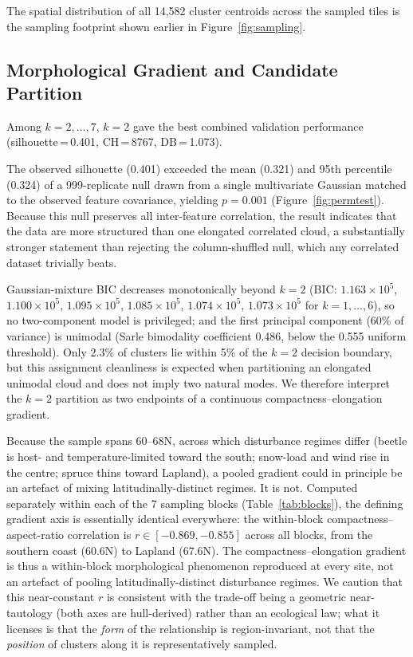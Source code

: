 \documentclass[twocolumn]{article}
\begin{document}
The spatial distribution of all 14,582 cluster centroids across the sampled tiles is the sampling
footprint shown earlier in Figure~\ref{fig:sampling}.

\subsection{Morphological Gradient and Candidate Partition}
\label{sec:res-typology}

Among $k=2,\ldots,7$, $k=2$ gave the best combined validation performance
(silhouette\,=\,0.401, CH\,=\,8767, DB\,=\,1.073).

The observed silhouette (0.401) exceeded the mean (0.321) and 95th percentile (0.324) of a
999-replicate null drawn from a single multivariate Gaussian matched to the observed feature
covariance, yielding $p = 0.001$ (Figure~\ref{fig:permtest}). Because this null preserves all
inter-feature correlation, the result indicates that the data are more structured than one
elongated correlated cloud, a substantially stronger statement than rejecting the
column-shuffled null, which any correlated dataset trivially beats.

Gaussian-mixture BIC decreases monotonically beyond $k=2$ (BIC: $1.163\times10^5$, $1.100\times10^5$,
$1.095\times10^5$, $1.085\times10^5$, $1.074\times10^5$, $1.073\times10^5$ for $k=1,\ldots,6$),
so no two-component model is privileged; and the first principal component (60\% of variance) is
unimodal (Sarle bimodality coefficient 0.486, below the 0.555 uniform threshold). Only 2.3\% of
clusters lie within 5\% of the $k=2$ decision boundary, but this assignment cleanliness is
expected when partitioning an elongated unimodal cloud and does not imply two natural modes.
We therefore interpret the $k=2$ partition as two endpoints of a continuous
compactness--elongation gradient.

Because the sample spans 60--68\textdegree{}N, across which disturbance regimes differ (beetle is
host- and temperature-limited toward the south; snow-load and wind rise in the centre; spruce
thins toward Lapland), a pooled gradient could in principle be an artefact of mixing
latitudinally-distinct regimes. It is not. Computed separately within each of the 7 sampling blocks (Table~\ref{tab:blocks}), the defining
gradient axis is essentially identical everywhere: the within-block compactness--aspect-ratio
correlation is $r \in [-0.869, -0.855]$ across all blocks, from the southern coast (60.6\textdegree{}N)
to Lapland (67.6\textdegree{}N). The compactness--elongation gradient is thus a within-block
morphological phenomenon reproduced at every site, not an artefact of pooling latitudinally-distinct
disturbance regimes. We caution that this near-constant $r$ is consistent with the trade-off being a
geometric near-tautology (both axes are hull-derived) rather than an ecological law; what it
licenses is that the \emph{form} of the relationship is region-invariant, not that the
\emph{position} of clusters along it is representatively sampled.
\end{document}
